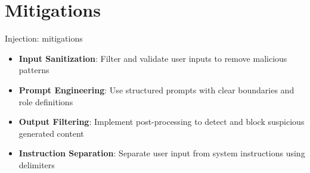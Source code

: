 \documentclass[aspectratio=169]{beamer}
\begin{document}
\section{Mitigations}

\begin{frame}{Injection: mitigations}
\begin{itemize}
    \item \textbf{Input Sanitization}: Filter and validate user inputs to remove malicious patterns
    \item \textbf{Prompt Engineering}: Use structured prompts with clear boundaries and role definitions
    \item \textbf{Output Filtering}: Implement post-processing to detect and block suspicious generated content
    \item \textbf{Instruction Separation}: Separate user input from system instructions using delimiters
\end{itemize}
\end{frame}
\end{document}
